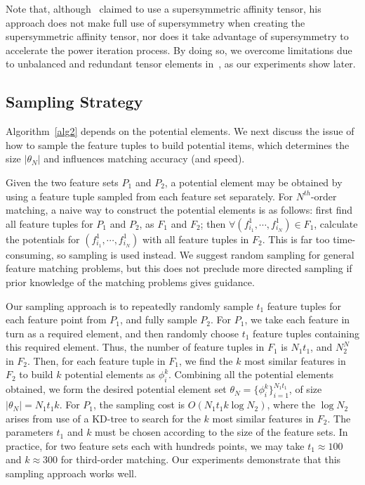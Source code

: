 Note that, although~\cite{Duchenne09} claimed to use a supersymmetric affinity tensor,
his approach does not make full use of supersymmetry when creating the supersymmetric affinity tensor,
nor does it take advantage of supersymmetry to accelerate the power iteration process.
By doing so, we overcome limitations due to unbalanced and redundant tensor elements in~\cite{Duchenne09}, as our experiments show later.



\subsection{Sampling Strategy}
\label{subsec:sampling}

Algorithm~\ref{alg2} depends on the potential elements.
We next discuss the issue of how to sample the feature tuples to build potential items, which determines the size $|\theta_N|$ and influences matching accuracy (and speed).

Given the two feature sets $P_1$ and $P_2$,
a potential element may be obtained by using a feature tuple sampled from each feature set separately.
For $N^{th}$-order matching, a naive way to construct the potential elements is as follows:
first find all feature tuples for $P_1$ and $P_2$, as $F_1$ and $F_2$; then $\forall (f_{i_1}^1, \cdots, f_{i_N}^1)\in F_1$,
calculate the potentials for $(f_{i_1}^1, \cdots, f_{i_N}^1)$ with all feature tuples in $F_2$.
This is far too time-consuming, so sampling is used instead.
We suggest random sampling for general feature matching problems,
but this does not preclude more directed sampling if prior knowledge of the matching problems gives guidance.

Our sampling approach is to repeatedly randomly sample $t_1$ feature tuples for each feature point from $P_1$, and fully sample $P_2$.
For $P_1$, we take each feature in turn as a required element, and then randomly choose $t_1$ feature tuples containing this required element.
Thus, the number of feature tuples in $F_1$ is $N_1t_1$, and $N_2^N$ in $F_2$.
Then, for each feature tuple in $F_1$, we find the $k$ most similar features in $F_2$ to build $k$ potential elements as $\phi_i^k$.
Combining all the potential elements obtained, we form the desired potential element set $\theta_N = \{\phi_i^k\}_{i=1}^{N_1 t_1}$, of size $|\theta_N| = N_1 t_1 k$.
For $P_1$, the sampling cost is $O(N_1  t_1 k \log N_2)$, where the $\log N_2$ arises from use of a KD-tree to search for the $k$ most similar features in $F_2$.
The parameters $t_1$ and $k$ must be chosen according to the size of the feature sets.
In practice, for two feature sets each with hundreds points,
we may take $t_1 \approx 100$ and $k\approx300$ for third-order matching.
Our experiments demonstrate that this sampling approach works well.

